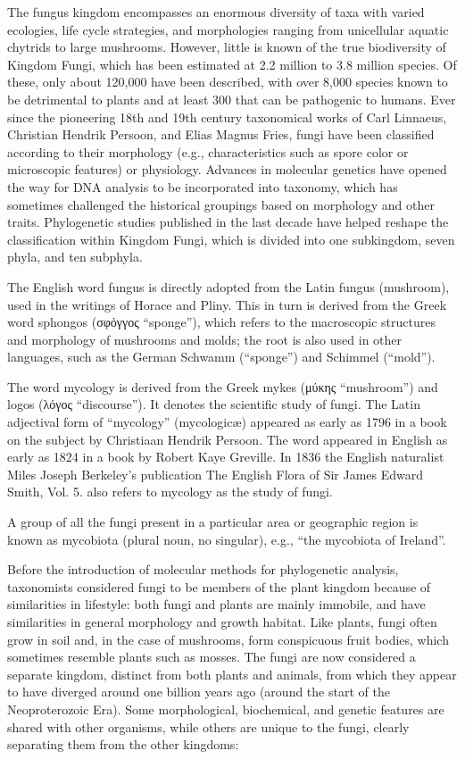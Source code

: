 The fungus kingdom encompasses an enormous diversity of taxa with varied ecologies, life cycle strategies, and morphologies ranging from unicellular aquatic chytrids to large mushrooms. However, little is known of the true biodiversity of Kingdom Fungi, which has been estimated at 2.2 million to 3.8 million species. Of these, only about 120,000 have been described, with over 8,000 species known to be detrimental to plants and at least 300 that can be pathogenic to humans. Ever since the pioneering 18th and 19th century taxonomical works of Carl Linnaeus, Christian Hendrik Persoon, and Elias Magnus Fries, fungi have been classified according to their morphology (e.g., characteristics such as spore color or microscopic features) or physiology. Advances in molecular genetics have opened the way for DNA analysis to be incorporated into taxonomy, which has sometimes challenged the historical groupings based on morphology and other traits. Phylogenetic studies published in the last decade have helped reshape the classification within Kingdom Fungi, which is divided into one subkingdom, seven phyla, and ten subphyla.

The English word fungus is directly adopted from the Latin fungus (mushroom), used in the writings of Horace and Pliny. This in turn is derived from the Greek word sphongos (σφόγγος ``sponge''), which refers to the macroscopic structures and morphology of mushrooms and molds; the root is also used in other languages, such as the German Schwamm (``sponge'') and Schimmel (``mold'').

The word mycology is derived from the Greek mykes (μύκης ``mushroom'') and logos (λόγος ``discourse''). It denotes the scientific study of fungi. The Latin adjectival form of ``mycology'' (mycologicæ) appeared as early as 1796 in a book on the subject by Christiaan Hendrik Persoon. The word appeared in English as early as 1824 in a book by Robert Kaye Greville. In 1836 the English naturalist Miles Joseph Berkeley's publication The English Flora of Sir James Edward Smith, Vol. 5. also refers to mycology as the study of fungi.

A group of all the fungi present in a particular area or geographic region is known as mycobiota (plural noun, no singular), e.g., ``the mycobiota of Ireland''.

Before the introduction of molecular methods for phylogenetic analysis, taxonomists considered fungi to be members of the plant kingdom because of similarities in lifestyle: both fungi and plants are mainly immobile, and have similarities in general morphology and growth habitat. Like plants, fungi often grow in soil and, in the case of mushrooms, form conspicuous fruit bodies, which sometimes resemble plants such as mosses. The fungi are now considered a separate kingdom, distinct from both plants and animals, from which they appear to have diverged around one billion years ago (around the start of the Neoproterozoic Era). Some morphological, biochemical, and genetic features are shared with other organisms, while others are unique to the fungi, clearly separating them from the other kingdoms:


